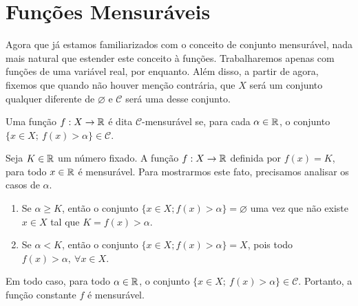 \section{Funções Mensuráveis}


Agora que já estamos familiarizados com o conceito de conjunto mensurável, nada mais natural que estender este conceito à funções. Trabalharemos apenas com funções de uma variável real, por enquanto.
Além disso, a partir de agora, fixemos que quando não houver menção contrária,  que $X$ será um conjunto qualquer diferente de $\varnothing$ e $\mathcal{C}$ será uma \sigal desse conjunto. 

\begin{definition}
    Uma função $f: X \to \mathbb{R} $ é dita $\mathcal{C}$-mensurável se, para cada $\alpha \in \mathbb{R}$, o conjunto $\{x \in X;\ f(x) > \alpha\} \in \mathcal{C}$.
\end{definition}


\begin{example}
\label{ex:funcao-constante}
Seja $K \in \mathbb{R}$ um número fixado. 
A função $f: X \to \mathbb{R}$ definida por $f(x) = K$, para todo $x \in \mathbb{R}$  é mensurável.
Para mostrarmos este fato, precisamos analisar os casos de $\alpha$.
\begin{enumerate}[label*= (\Roman*)]
\item Se $\alpha \geq K$, então o conjunto $\{x \in X; f(x) > \alpha\} = \varnothing$ uma vez que não existe $x \in X$ tal que $K = f(x) > \alpha$.
\item Se $\alpha < K$, então  o conjunto $\{x \in X; f(x) > \alpha\} = X$, pois todo $f(x) > \alpha,\ \forall x \in X$.
\end{enumerate}
Em todo caso, para todo $\alpha \in \mathbb{R}$, o conjunto  $\{x \in X;\ f(x) > \alpha\} \in \mathcal{C}$.
Portanto, a função constante $f$ é mensurável.

\end{example}

